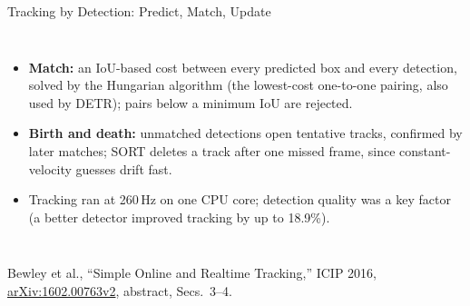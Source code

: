 \begin{frame}{Tracking by Detection: Predict, Match, Update}
\begin{columns}[T,onlytextwidth]
{\par}
      \begin{itemize}\scriptsize\itemsep0.2em
        \item \textbf{Match:} an IoU-based cost between every predicted box and every detection, solved by the Hungarian algorithm (the lowest-cost one-to-one pairing, also used by DETR); pairs below a minimum IoU are rejected.
        \item \textbf{Birth and death:} unmatched detections open tentative tracks, confirmed by later matches; SORT deletes a track after one missed frame, since constant-velocity guesses drift fast.
        \item Tracking ran at 260\,Hz on one CPU core; detection quality was a key factor (a better detector improved tracking by up to 18.9\%).
      \end{itemize}
  \end{columns}
  \vspace{-0.6em}
  {\scriptsize Bewley et al., ``Simple Online and Realtime Tracking,'' ICIP 2016, \href{https://arxiv.org/abs/1602.00763v2}{arXiv:1602.00763v2}, abstract, Secs.~3--4.\par}
\end{frame}

